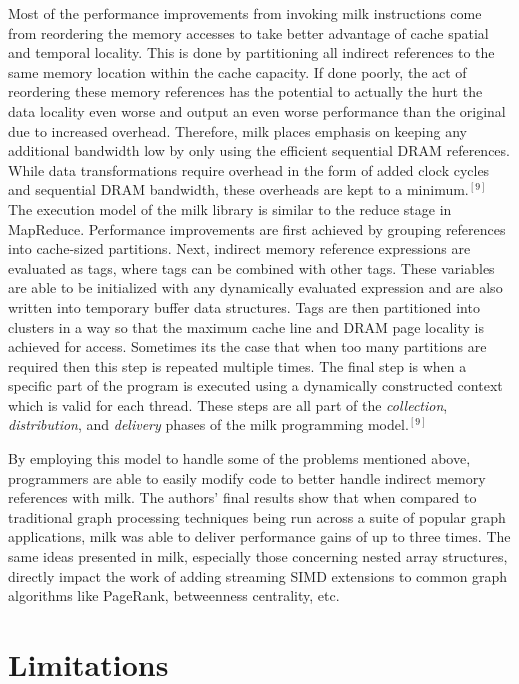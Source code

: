 \documentclass[conference]{IEEEtran}
\begin{document}
Most of the performance improvements from invoking milk instructions come from reordering the memory accesses to take better advantage of cache spatial and temporal locality.  This is done by partitioning all indirect references to the same memory location within the cache capacity.  If done poorly, the act of reordering these memory references has the potential to actually the hurt the data locality even worse and output an even worse performance than the original due to increased overhead.  Therefore, milk places emphasis on keeping any additional bandwidth low by only using the efficient sequential DRAM references.  While data transformations require overhead in the form of added clock cycles and sequential DRAM bandwidth, these overheads are kept to a minimum.$^{[9]}$  The execution model of the milk library is similar to the reduce stage in MapReduce.  Performance improvements are first achieved by grouping references into cache-sized partitions.  Next, indirect memory reference expressions are evaluated as tags, where tags can be combined with other tags.  These variables are able to be initialized with any dynamically evaluated expression and are also written into temporary buffer data structures.  Tags are then partitioned into clusters in a way so that the maximum cache line and DRAM page locality is achieved for access.  Sometimes its the case that when too many partitions are required then this step is repeated multiple times.  The final step is when a specific part of the program is executed using a dynamically constructed context which is valid for each thread.  These steps are all part of the \textit{collection}, \textit{distribution}, and \textit{delivery} phases of the milk programming model.$^{[9]}$  

By employing this model to handle some of the problems mentioned above, programmers are able to easily modify code to better handle indirect memory references with milk.  The authors' final results show that when compared to traditional graph processing techniques being run across a suite of popular graph applications, milk was able to deliver performance gains of up to three times.  The same ideas presented in milk, especially those concerning nested array structures, directly impact the work of adding streaming SIMD extensions to common graph algorithms like PageRank, betweenness centrality, etc.  

\section{Limitations}
\end{document}
